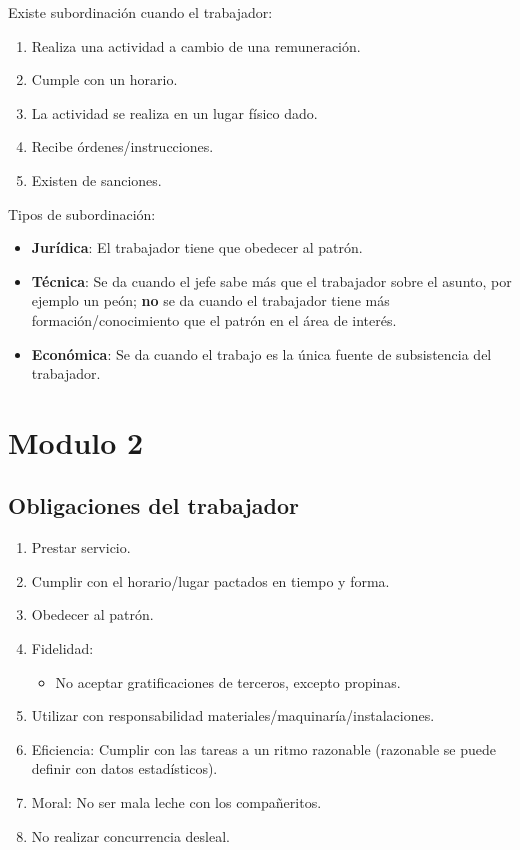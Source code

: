 \documentclass[spanish,12pt,a4paper,titlepage]{report}
\begin{document}
Existe subordinación cuando el trabajador:
\begin{enumerate}
\item Realiza una actividad a cambio de una remuneración.
\item Cumple con un horario.
\item La actividad se realiza en un lugar físico dado.
\item Recibe órdenes/instrucciones.
\item Existen de sanciones.
\end{enumerate}

Tipos de subordinación:

\begin{itemize}
\item \textbf{Jurídica}: El trabajador tiene que obedecer al patrón.
\item \textbf{Técnica}: Se da cuando el jefe sabe más que el trabajador sobre el asunto, por ejemplo un peón; \textbf{no} se da cuando el trabajador tiene más formación/conocimiento que el patrón en el área de interés.
\item \textbf{Económica}: Se da cuando el trabajo es la única fuente de subsistencia del trabajador.
\end{itemize}

\section{Modulo 2}

\subsection{Obligaciones del trabajador}

\begin{enumerate}
\item Prestar servicio.
\item Cumplir con el horario/lugar pactados en tiempo y forma.
\item Obedecer al patrón.
\item Fidelidad:
  \begin{itemize}
  \item No aceptar gratificaciones de terceros, excepto propinas.
  \end{itemize}
\item Utilizar con responsabilidad materiales/maquinaría/instalaciones.
\item Eficiencia: Cumplir con las tareas a un ritmo razonable (razonable se puede definir con datos estadísticos).
\item Moral: No ser mala leche con los compañeritos.
\item No realizar concurrencia desleal.
\end{enumerate}
\end{document}
